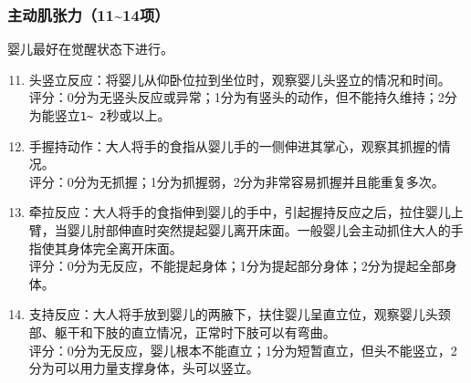 \subsubsection{主动肌张力（11\textasciitilde14项）}

婴儿最好在觉醒状态下进行。

\begin{enumerate}
\setcounter{enumi}{10}
\item
  头竖立反应：将婴儿从仰卧位拉到坐位时，观察婴儿头竖立的情况和时间。\\
  评分：0分为无竖头反应或异常；1分为有竖头的动作，但不能持久维持；2分为能竖立\texttt{1\textasciitilde{}\ 2}\hspace{0pt}秒或以上。
\item
  手握持动作：大人将手的食指从婴儿手的一侧伸进其掌心，观察其抓握的情况。\\
  评分：0分为无抓握；1分为抓握弱，2分为非常容易抓握并且能重复多次。
\item
  牵拉反应：大人将手的食指伸到婴儿的手中，引起握持反应之后，拉住婴儿上臂，当婴儿肘部伸直时突然提起婴儿离开床面。一般婴儿会主动抓住大人的手指使其身体完全离开床面。\\
  评分：0分为无反应，不能提起身体；1分为提起部分身体；2分为提起全部身体。
\item
  支持反应：大人将手放到婴儿的两腋下，扶住婴儿呈直立位，观察婴儿头颈部、躯干和下肢的直立情况，正常时下肢可以有弯曲。\\
  评分：0分为无反应，婴儿根本不能直立；1分为短暂直立，但头不能竖立，2分为可以用力量支撑身体，头可以竖立。
\end{enumerate}

